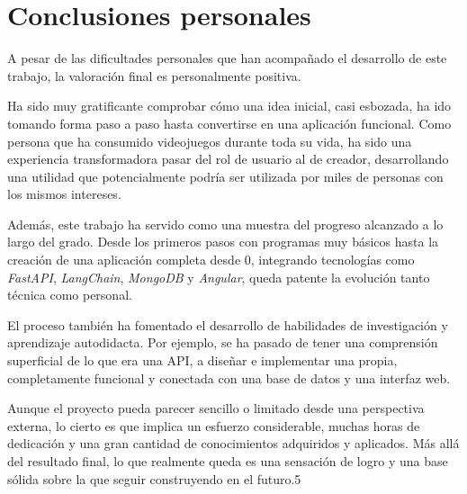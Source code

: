 \section{Conclusiones personales}

A pesar de las dificultades personales que han acompañado el desarrollo de este trabajo, la valoración final es personalmente positiva.

Ha sido muy gratificante comprobar cómo una idea inicial, casi esbozada, ha ido tomando forma paso a paso hasta convertirse en una aplicación funcional. Como persona que ha consumido videojuegos durante toda su vida, ha sido una experiencia transformadora pasar del rol de usuario al de creador, desarrollando una utilidad que potencialmente podría ser utilizada por miles de personas con los mismos intereses.

Además, este trabajo ha servido como una muestra del progreso alcanzado a lo largo del grado. Desde los primeros pasos con programas muy básicos hasta la creación de una aplicación completa desde 0, integrando tecnologías como \textit{FastAPI}, \textit{LangChain}, \textit{MongoDB} y \textit{Angular}, queda patente la evolución tanto técnica como personal.

El proceso también ha fomentado el desarrollo de habilidades de investigación y aprendizaje autodidacta. Por ejemplo, se ha pasado de tener una comprensión superficial de lo que era una API, a diseñar e implementar una propia, completamente funcional y conectada con una base de datos y una interfaz web.

Aunque el proyecto pueda parecer sencillo o limitado desde una perspectiva externa, lo cierto es que implica un esfuerzo considerable, muchas horas de dedicación y una gran cantidad de conocimientos adquiridos y aplicados. Más allá del resultado final, lo que realmente queda es una sensación de logro y una base sólida sobre la que seguir construyendo en el futuro.5


